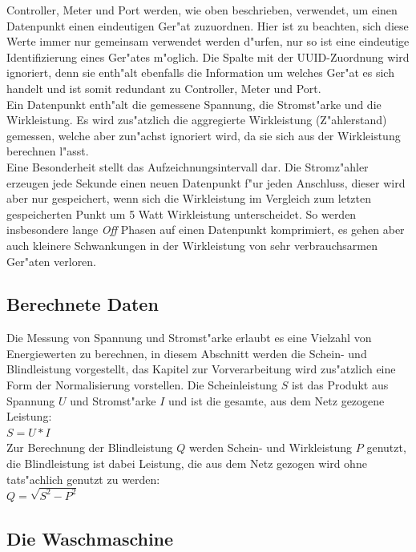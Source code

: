 Controller, Meter und Port werden, wie oben beschrieben, verwendet, um einen Datenpunkt einen eindeutigen Ger"at zuzuordnen. Hier ist zu beachten, sich diese Werte immer nur gemeinsam verwendet werden d"urfen, nur so ist eine eindeutige Identifizierung eines Ger"ates m"oglich.
Die Spalte mit der UUID-Zuordnung wird ignoriert, denn sie enth"alt ebenfalls die Information um welches Ger"at es sich handelt und ist somit redundant zu Controller, Meter und Port. \\
Ein Datenpunkt enth"alt die gemessene Spannung, die Stromst"arke und die Wirkleistung. Es wird zus"atzlich die aggregierte Wirkleistung (Z"ahlerstand) gemessen, welche aber zun"achst ignoriert wird, da sie sich aus der Wirkleistung berechnen l"asst. \\
Eine Besonderheit stellt das Aufzeichnungsintervall dar. Die Stromz"ahler erzeugen jede Sekunde einen neuen Datenpunkt f"ur jeden Anschluss, dieser wird aber nur gespeichert, wenn sich die Wirkleistung im Vergleich zum letzten gespeicherten Punkt um 5 Watt Wirkleistung unterscheidet. So werden insbesondere lange \textit{Off} Phasen auf einen Datenpunkt komprimiert, es gehen aber auch kleinere Schwankungen in der Wirkleistung von sehr verbrauchsarmen Ger"aten verloren.


\subsection{Berechnete Daten}
\label{Berechnete Daten}

Die Messung von Spannung und Stromst"arke erlaubt es eine Vielzahl von Energiewerten zu berechnen, in diesem Abschnitt werden die Schein- und Blindleistung vorgestellt, das Kapitel zur Vorverarbeitung wird zus"atzlich eine Form der Normalisierung vorstellen. 
Die Scheinleistung $S$ ist das Produkt aus Spannung $U$ und Stromst"arke $I$ und ist die gesamte, aus dem Netz gezogene Leistung:\\ $S = U * I$\\[0.5cm]
Zur Berechnung der Blindleistung $Q$ werden Schein- und Wirkleistung $P$ genutzt, die Blindleistung ist dabei Leistung, die aus dem Netz gezogen wird ohne tats"achlich genutzt zu werden:\\ $Q = \sqrt{S^2 - P^2}$ \\


\subsection{Die Waschmaschine}
\label{Die Waschmaschine}

